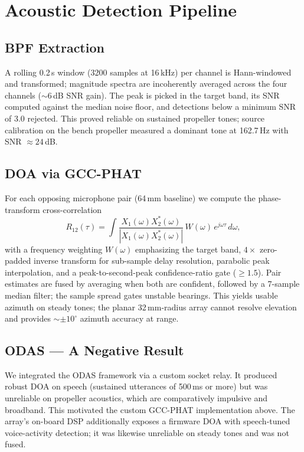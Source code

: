 \documentclass[conference]{IEEEtran}
\begin{document}
\section{Acoustic Detection Pipeline}
\label{sec:acoustic}

\subsection{BPF Extraction}
A rolling 0.2\,s window (3200 samples at 16\,kHz) per channel is
Hann-windowed and transformed; magnitude spectra are incoherently averaged
across the four channels (${\sim}6$\,dB SNR gain). The peak is picked in
the target band, its SNR computed against the median noise floor, and
detections below a minimum SNR of 3.0 rejected. This proved reliable on
sustained propeller tones; source calibration on the bench propeller
measured a dominant tone at 162.7\,Hz with SNR $\approx 24$\,dB.

\subsection{DOA via GCC-PHAT}
For each opposing microphone pair (64\,mm baseline) we compute the
phase-transform cross-correlation
\begin{equation}
R_{12}(\tau) = \int
\frac{X_1(\omega) X_2^{*}(\omega)}{\left| X_1(\omega) X_2^{*}(\omega)
\right|} \, W(\omega)\, e^{j\omega\tau} \, d\omega,
\label{eq:gccphat}
\end{equation}
with a frequency weighting $W(\omega)$ emphasizing the target band,
$4\times$ zero-padded inverse transform for sub-sample delay resolution,
parabolic peak interpolation, and a peak-to-second-peak confidence-ratio
gate ($\ge 1.5$). Pair estimates are fused by averaging when both are
confident, followed by a 7-sample median filter; the sample spread gates
unstable bearings. This yields usable azimuth on steady tones; the planar
32\,mm-radius array cannot resolve elevation and provides
${\sim}\pm 10^{\circ}$ azimuth accuracy at range.

\subsection{ODAS --- A Negative Result}
We integrated the ODAS framework \cite{grondin2019} via a custom socket
relay. It produced robust DOA on speech (sustained utterances of 500\,ms
or more) but was unreliable on propeller acoustics, which are
comparatively impulsive and broadband. This motivated the custom GCC-PHAT
implementation above. The array's on-board DSP additionally exposes a
firmware DOA with speech-tuned voice-activity detection; it was likewise
unreliable on steady tones and was not fused.
\end{document}
